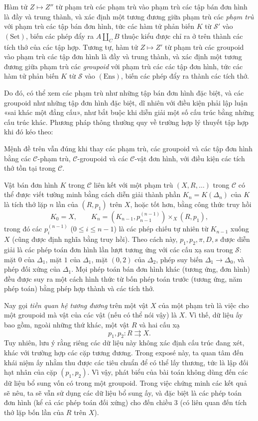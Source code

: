  Hàm tử $Z\longmapsto Z''$ từ phạm trù các phạm trù vào
phạm trù các tập bán đơn hình là đầy và trung thành, và xác định một tương
đương giữa phạm trù các \emph{phạm trù} với phạm trù các tập bán đơn hình,
tức các hàm tử phản biến $K$ từ $\mathcal S'$ vào $(\mathrm{Set})$, biến các
phép đẩy ra $A\amalg_C B$ thuộc kiểu được chỉ ra ở trên thành các tích thớ của
các tập hợp. Tương tự, hàm tử $Z\longmapsto Z'$ từ phạm trù các groupoid vào
phạm trù các tập đơn hình là đầy và trung thành, và xác định một tương
đương giữa phạm trù các \emph{groupoid} với phạm trù các
các tập đơn hình, tức các hàm tử phản biến $K$ từ $\mathcal S$ vào
$(\mathrm{Ens})$, biến các phép đẩy ra thành các tích thớ.

Do đó, có thể xem các phạm trù như những tập bán đơn hình đặc biệt, và các
groupoid như những tập đơn hình đặc biệt, dĩ nhiên với điều kiện phải lập luận
«sai khác một đẳng cấu», như bắt buộc khi diễn giải một số cấu trúc bằng những
cấu trúc khác. Phương pháp thông thường quy về trường hợp lý thuyết tập hợp
khi đó kéo theo:

 Mệnh đề trên vẫn đúng khi thay các phạm trù, các
groupoid và các tập đơn hình bằng các $\mathcal C$-phạm trù,
$\mathcal C$-groupoid và các $\mathcal C$-vật đơn hình, với điều kiện các tích
thớ tồn tại trong $\mathcal C$.

Vật bán đơn hình $K$ trong $\mathcal C$ liên kết với một phạm trù
$(X,R,\ldots)$ trong $\mathcal C$ có thể được viết tường minh bằng cách diễn
giải thành phần $K_n=K(\Delta_n)$ của $K$ là tích thớ lặp $n$ lần của
$(R,p_1)$ trên $X$, hoặc tốt hơn, bằng công thức truy hồi
\[
  K_0=X,\qquad
  K_n=(K_{n-1},p_{n-1}^{(n-1)})\times_X(R,p_1),
\]
trong đó các $p_i^{(n-1)}$ ($0\leq i\leq n-1$) là các phép chiếu tự nhiên từ
$K_{n-1}$ xuống $X$ (cũng được định nghĩa bằng truy hồi). Theo cách này,
$p_1,p_2,\pi,D,s$ được diễn giải là các phép toán đơn hình lần lượt tương ứng
với các cấu xạ sau trong $\mathcal S$: mặt $0$ của $\Delta_1$, mặt $1$ của
$\Delta_1$, mặt $(0,2)$ của $\Delta_2$, phép suy biến
$\Delta_1\to\Delta_0$, và phép đối xứng của $\Delta_1$. Mọi phép toán bán đơn
hình khác (tương ứng, đơn hình) đều được suy ra một cách hình thức từ bốn
phép toán trước (tương ứng, năm phép toán) bằng phép hợp thành và các tích thớ.

Nay gọi \emph{tiền quan hệ tương đương} trên một vật $X$ của một phạm trù là
việc cho một groupoid mà vật của các vật (nếu có thể nói vậy) là $X$. Vì thế,
dữ liệu ấy bao gồm, ngoài những thứ khác, một vật $R$ và hai cấu xạ
\[
  p_1,p_2:R\rightrightarrows X.
\]
Tuy nhiên, lưu ý rằng riêng các dữ liệu này không xác định cấu trúc đang xét,
khác với trường hợp các cặp tương đương. Trong exposé này, ta quan tâm đến
khái niệm ấy nhằm thu được các tiêu chuẩn để có thể lấy thương, tức là lập đối
hạt nhân của cặp $(p_1,p_2)$. Vì vậy, phát biểu của bài toán không dùng đến
các dữ liệu bổ sung vốn có trong một groupoid. Trong việc chứng minh các kết
quả sẽ nêu, ta sẽ
vẫn sử dụng các dữ liệu bổ sung ấy, và đặc biệt là các phép toán đơn hình
(kể cả các phép toán đối xứng) cho đến chiều $3$ (có liên quan đến tích thớ
lặp bốn lần của $R$ trên $X$).

